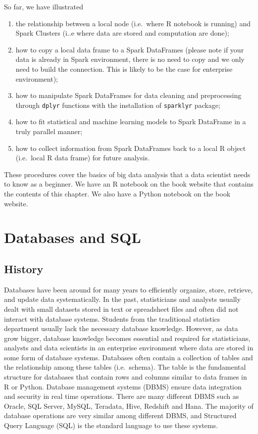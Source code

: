 \documentclass[
  12pt,
]{krantz}
\providecommand{\tightlist}{%
  \setlength{\itemsep}{0pt}\setlength{\parskip}{0pt}}
\begin{document}
So far, we have illustrated

\begin{enumerate}
\def\labelenumi{\arabic{enumi}.}
\tightlist
\item
  the relationship between a local node (i.e.~where R notebook is running) and Spark Clusters (i..e where data are stored and computation are done);
\item
  how to copy a local data frame to a Spark DataFrames (please note if your data is already in Spark environment, there is no need to copy and we only need to build the connection. This is likely to be the case for enterprise environment);
\item
  how to manipulate Spark DataFrames for data cleaning and preprocessing through \texttt{dplyr} functions with the installation of \texttt{sparklyr} package;
\item
  how to fit statistical and machine learning models to Spark DataFrame in a truly parallel manner;
\item
  how to collect information from Spark DataFrames back to a local R object (i.e.~local R data frame) for future analysis.
\end{enumerate}

These procedures cover the basics of big data analysis that a data scientist needs to know as a beginner. We have an R notebook on the book website that contains the contents of this chapter. We also have a Python notebook on the book website.

\hypertarget{databases-and-sql}{%
\section{Databases and SQL}\label{databases-and-sql}}

\hypertarget{history}{%
\subsection{History}\label{history}}

Databases have been around for many years to efficiently organize, store, retrieve, and update data systematically. In the past, statisticians and analysts usually dealt with small datasets stored in text or spreadsheet files and often did not interact with database systems. Students from the traditional statistics department usually lack the necessary database knowledge. However, as data grow bigger, database knowledge becomes essential and required for statisticians, analysts and data scientists in an enterprise environment where data are stored in some form of database systems. Databases often contain a collection of tables and the relationship among these tables (i.e.~schema). The table is the fundamental structure for databases that contain rows and columns similar to data frames in R or Python. Database management systems (DBMS) ensure data integration and security in real time operations. There are many different DBMS such as Oracle, SQL Server, MySQL, Teradata, Hive, Redshift and Hana. The majority of database operations are very similar among different DBMS, and Structured Query Language (SQL) is the standard language to use these systems.
\end{document}
